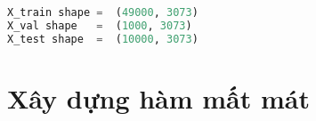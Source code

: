 \kq
\begin{lstlisting}[language=Python]
X_train shape =  (49000, 3073)
X_val shape   =  (1000, 3073)
X_test shape  =  (10000, 3073)
\end{lstlisting}
\section{Xây dựng hàm mất mát }








